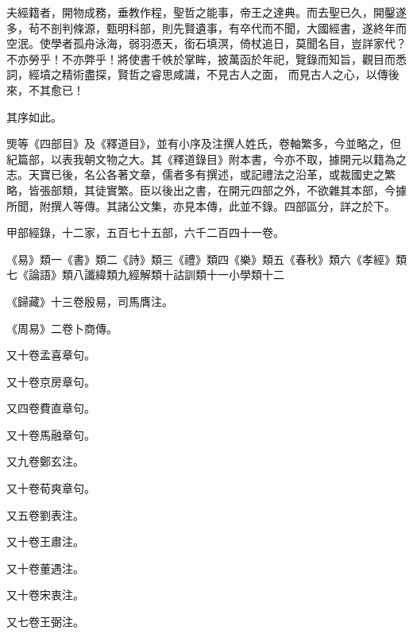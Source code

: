 \begin{pinyinscope}
 夫經籍者，開物成務，垂教作程，聖哲之能事，帝王之達典。而去聖已久，開鑿遂多，茍不剖判條源，甄明科部，則先賢遺事，有卒代而不聞，大國經書，遂終年而空泯。使學者孤舟泳海，弱羽憑天，銜石填溟，倚杖追日，莫聞名目，豈詳家代？不亦勞乎！不亦弊乎！將使書千帙於掌眸，披萬函於年祀，覽錄而知旨，觀目而悉詞，經墳之精術盡探，賢哲之睿思咸識，不見古人之面，
 而見古人之心，以傳後來，不其愈已！



 其序如此。



 煚等《四部目》及《釋道目》，並有小序及注撰人姓氏，卷軸繁多，今並略之，但紀篇部，以表我朝文物之大。其《釋道錄目》附本書，今亦不取，據開元以籍為之志。天寶已後，名公各著文章，儒者多有撰述，或記禮法之沿革，或裁國史之繁略，皆張部類，其徒實繁。臣以後出之書，在開元四部之外，不欲雜其本部，今據所聞，附撰人等傳。其諸公文集，亦見本傳，此並不錄。四部區分，詳之於下。



 甲部經錄，十二家，五百七十五部，六千二百四十一卷。



 《易》類一《書》類二《詩》類三《禮》類四《樂》類五《春秋》類六《孝經》類七《論語》類八讖緯類九經解類十詁訓類十一小學類十二



 《歸藏》十三卷殷易，司馬膺注。



 《周易》二卷卜商傳。



 又十卷孟喜章句。



 又十卷京房章句。



 又四卷費直章句。



 又十卷馬融章句。



 又九卷鄭玄注。



 又十卷荀爽章句。



 又五卷劉表注。



 又十卷王肅注。



 又十卷董遇注。



 又十卷宋衷注。



 又七卷王弼注。




\end{pinyinscope}
